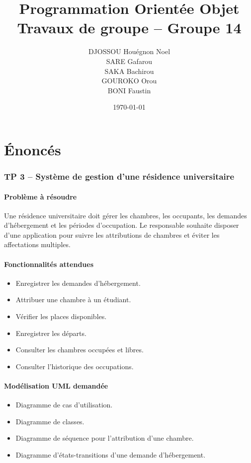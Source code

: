 \documentclass[12pt,a4paper]{article}
\title{\textbf{Programmation Orientée Objet}\\[4pt]
\large Travaux de groupe -- Groupe 14}
\author{
 DJOSSOU Houégnon Noel \\ SARE Gafarou \\ SAKA Bachirou \\ GOUROKO Orou \\ BONI Faustin
}
\date{\today}
\begin{document}
\maketitle
\thispagestyle{empty}
\vspace{1cm}
\tableofcontents
\newpage

\part*{Énoncés}

\section{TP 3 -- Système de gestion d'une résidence universitaire}

\subsection{Problème à résoudre}
Une résidence universitaire doit gérer les chambres, les occupants, les demandes d'hébergement et les périodes d'occupation. Le responsable souhaite disposer d'une application pour suivre les attributions de chambres et éviter les affectations multiples.

\subsection{Fonctionnalités attendues}
\begin{itemize}
  \item Enregistrer les demandes d'hébergement.
  \item Attribuer une chambre à un étudiant.
  \item Vérifier les places disponibles.
  \item Enregistrer les départs.
  \item Consulter les chambres occupées et libres.
  \item Consulter l'historique des occupations.
\end{itemize}

\subsection{Modélisation UML demandée}
\begin{itemize}
  \item Diagramme de cas d'utilisation.
  \item Diagramme de classes.
  \item Diagramme de séquence pour l'attribution d'une chambre.
  \item Diagramme d'états-transitions d'une demande d'hébergement.
\end{itemize}
\end{document}
